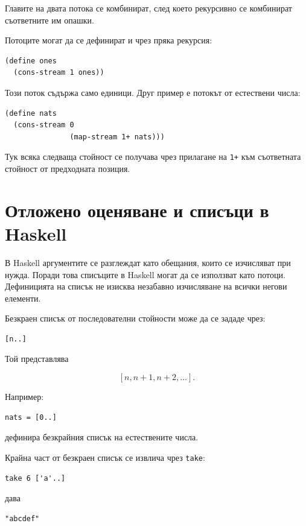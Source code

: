 Главите на двата потока се комбинират, след което рекурсивно се комбинират съответните им опашки.

Потоците могат да се дефинират и чрез пряка рекурсия:

\begin{verbatim}
(define ones
  (cons-stream 1 ones))
\end{verbatim}

Този поток съдържа само единици. Друг пример е потокът от естествени числа:

\begin{verbatim}
(define nats
  (cons-stream 0
               (map-stream 1+ nats)))
\end{verbatim}

Тук всяка следваща стойност се получава чрез прилагане на \texttt{1+} към съответната стойност от предходната позиция.

\section{Отложено оценяване и списъци в Haskell}\label{s:20.6}

В Haskell аргументите се разглеждат като обещания, които се изчисляват при нужда. Поради това списъците в Haskell могат да се използват като потоци. Дефиницията на списък не изисква незабавно изчисляване на всички негови елементи.

Безкраен списък от последователни стойности може да се зададе чрез:

\begin{verbatim}
[n..]
\end{verbatim}

Той представлява

\[
[n,n+1,n+2,\ldots].
\]

Например:

\begin{verbatim}
nats = [0..]
\end{verbatim}

дефинира безкрайния списък на естествените числа.

Крайна част от безкраен списък се извлича чрез \texttt{take}:

\begin{verbatim}
take 6 ['a'..]
\end{verbatim}

дава

\begin{verbatim}
"abcdef"
\end{verbatim}


